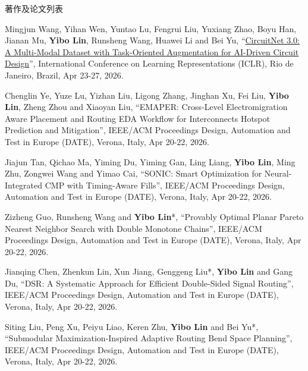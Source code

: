 \begin{rSection}{著作及论文列表}
\begin{description}[font=\normalfont, rightmargin=2em]
{}
            

\item[{[C219]}]{
        Mingjun Wang, Yihan Wen, Yuntao Lu, Fengrui Liu, Yuxiang Zhao, Boyu Han, Jianan Mu, \textbf{Yibo Lin}, Runsheng Wang, Huawei Li and Bei Yu, 
    ``\href{https://openreview.net/forum?id=lEDb4gQ4dB}{CircuitNet 3.0: A Multi-Modal Dataset with Task-Oriented Augmentation for AI-Driven Circuit Design}'', 
    International Conference on Learning Representations (ICLR), Rio de Janeiro, Brazil, Apr 23-27, 2026.
    
}
            

\item[{[C218]}]{
        Chenglin Ye, Yuze Lu, Yizhan Liu, Ligong Zhang, Jinghan Xu, Fei Liu, \textbf{Yibo Lin}, Zheng Zhou and Xiaoyan Liu, 
    ``EMAPER: Cross-Level Electromigration Aware Placement and Routing EDA Workflow for Interconnects Hotspot Prediction and Mitigation'', 
    IEEE/ACM Proceedings Design, Automation and Test in Europe (DATE), Verona, Italy, Apr 20-22, 2026.
    
}
            

\item[{[C217]}]{
        Jiajun Tan, Qichao Ma, Yiming Du, Yiming Gan, Ling Liang, \textbf{Yibo Lin}, Ming Zhu, Zongwei Wang and Yimao Cai, 
    ``SONIC: Smart Optimization for Neural-Integrated CMP with Timing-Aware Fills'', 
    IEEE/ACM Proceedings Design, Automation and Test in Europe (DATE), Verona, Italy, Apr 20-22, 2026.
    
}
            

\item[{[C216]}]{
        Zizheng Guo, Runsheng Wang and \textbf{Yibo Lin}*, 
    ``Provably Optimal Planar Pareto Nearest Neighbor Search with Double Monotone Chains'', 
    IEEE/ACM Proceedings Design, Automation and Test in Europe (DATE), Verona, Italy, Apr 20-22, 2026.
    
}
            

\item[{[C215]}]{
        Jianqing Chen, Zhenkun Lin, Xun Jiang, Genggeng Liu*, \textbf{Yibo Lin} and Gang Du, 
    ``DSR: A Systematic Approach for Efficient Double-Sided Signal Routing'', 
    IEEE/ACM Proceedings Design, Automation and Test in Europe (DATE), Verona, Italy, Apr 20-22, 2026.
    
}
            

\item[{[C214]}]{
        Siting Liu, Peng Xu, Peiyu Liao, Keren Zhu, \textbf{Yibo Lin} and Bei Yu*, 
    ``Submodular Maximization-Inspired Adaptive Routing Bend Space Planning'', 
    IEEE/ACM Proceedings Design, Automation and Test in Europe (DATE), Verona, Italy, Apr 20-22, 2026.
    
}
\end{description}
\end{rSection}
